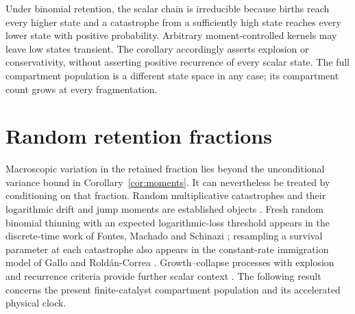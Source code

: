 \documentclass[11pt,a4paper]{article}
\theoremstyle{remark}\newtheorem{remark}[theorem]{Remark}
\begin{document}
Under binomial retention, the scalar chain is irreducible because births reach every higher state and a catastrophe from a sufficiently high state reaches every lower state with positive probability. Arbitrary moment-controlled kernels may leave low states transient. The corollary accordingly asserts explosion or conservativity, without asserting positive recurrence of every scalar state. The full compartment population is a different state space in any case; its compartment count grows at every fragmentation.

\section{Random retention fractions}\label{sec:random-retention}

Macroscopic variation in the retained fraction lies beyond the unconditional variance bound in Corollary~\ref{cor:moments}. It can nevertheless be treated by conditioning on that fraction. Random multiplicative catastrophes and their logarithmic drift and jump moments are established objects \cite{bansaye2013,meleard2015}. Fresh random binomial thinning with an expected logarithmic-loss threshold appears in the discrete-time work of Fontes, Machado and Schinazi \cite{fontes2023}; resampling a survival parameter at each catastrophe also appears in the constant-rate immigration model of Gallo and Rold\'an-Correa \cite{gallo2026}. Growth--collapse processes with explosion and recurrence criteria provide further scalar context \cite{goncalves2021}. The following result concerns the present finite-catalyst compartment population and its accelerated physical clock.
\end{document}

